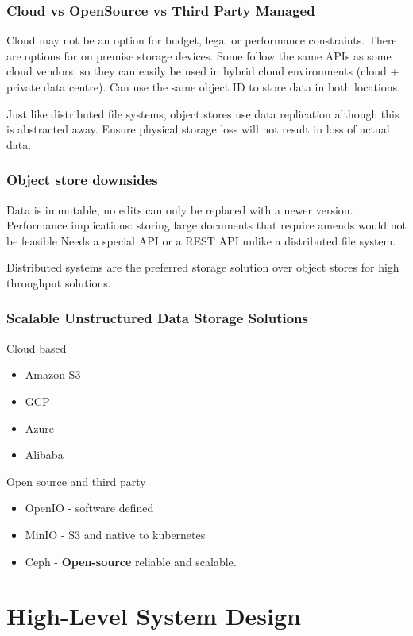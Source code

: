 \documentclass[a4paper, 11pt]{book}
\begin{document}
    \subsection{Cloud vs OpenSource vs Third Party Managed}
    Cloud may not be an option for budget, legal or performance constraints.
    There are options for on premise storage devices.
    Some follow the same APIs as some cloud vendors, so they can easily be used in hybrid cloud environments (cloud + private data centre).
    Can use the same object ID to store data in both locations.

    Just like distributed file systems, object stores use data replication although this is abstracted away.
    Ensure physical storage loss will not result in loss of actual data.

    \subsection{Object store downsides}
    Data is immutable, no edits can only be replaced with a newer version.
    Performance implications: storing large documents that require amends would not be feasible
    Needs a special API or a REST API unlike a distributed file system.

    Distributed systems are the preferred storage solution over object stores for high throughput solutions.

    \subsection{Scalable Unstructured Data Storage Solutions}
    Cloud based
    \begin{itemize}%
        \item Amazon S3
        \item GCP
        \item Azure
        \item Alibaba
    \end{itemize}

    Open source and third party
    \begin{itemize}
        \item OpenIO - software defined
        \item MinIO - S3 and native to kubernetes
        \item Ceph - \textbf{Open-source} reliable and scalable.
    \end{itemize}


    \chapter{High-Level System Design}
\end{document}
